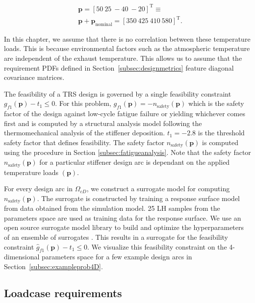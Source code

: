 \begin{equation*}
	\begin{aligned}
		& \mathbf{p} = \left[50 ~ 25 ~ -40 ~ -20\right]^{\mathrm{T}} \equiv \\
		& \mathbf{p} + \mathbf{p}_{\textrm{nominal}} = \left[350 ~ 425 ~ 410 ~ 580\right]^{\mathrm{T}}.
	\end{aligned}
\end{equation*}

In this chapter, we assume that there is no correlation between these temperature loads. This is because environmental factors such as the atmospheric temperature are independent of the exhaust temperature. This allows us to assume that the requirement \acp{PDF} defined in Section~\ref{subsec:designmetrics} feature diagonal covariance matrices.

The feasibility of a \ac{TRS} design is governed by a single feasibility constraint $g_{f1}(\mathbf{p}) - t_1 \le 0$. For this problem, $g_{f1}(\mathbf{p}) = -n_{\textrm{safety}}(\mathbf{p})$ which is the safety factor of the design against low-cycle fatigue failure or yielding whichever comes first and is computed by a structural analysis model following the thermomechanical analysis of the stiffener deposition. $t_1 = -2.8$ is the threshold safety factor that defines feasibility. The safety factor $n_{\textrm{safety}}(\mathbf{p})$ is computed using the procedure in Section \ref{subsec:fatigueanalysis}. Note that the safety factor $n_{\textrm{safety}}(\mathbf{p})$ for a particular stiffener design arc is dependant on the applied temperature loads $(\mathbf{p})$.

For every design arc in $\Omega_{cD}$, we construct a surrogate model for computing $n_{\textrm{safety}}(\mathbf{p})$. The surrogate is constructed by training a response surface model from data obtained from the simulation model. 25 \ac{LH} samples from the parameters space are used as training data for the response surface. We use an open source surrogate model library to build and optimize the hyperparameters of an ensemble of surrogates \cite{Talgorn2018}. This results in a surrogate for the feasibility constraint $\hat{g}_{f1}(\mathbf{p}) - t_1 \le 0$. We visualize this feasibility constraint on the 4-dimensional parameters space for a few example design arcs in Section~\ref{subsec:exampleprob4D}. 

\subsection{Loadcase requirements} \label{subsec:loadcasereq}

